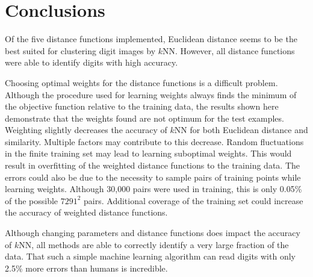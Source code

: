 \documentclass[10pt,twocolumn,letterpaper]{article}
\begin{document}

\section{Conclusions}
Of the five distance functions implemented, Euclidean distance seems to be the best suited for clustering digit images by $k$NN. However, all distance functions were able to identify digits with high accuracy.

Choosing optimal weights for the distance functions is a difficult problem. Although the procedure used for learning weights always finds the minimum of the objective function relative to the training data, the results shown here demonstrate that the weights found are not optimum for the test examples. Weighting slightly decreases the accuracy of $k$NN for both Euclidean distance and similarity. Multiple factors may contribute to this decrease. Random fluctuations in the finite training set may lead to learning suboptimal weights. This would result in overfitting of the weighted distance functions to the training data. The errors could also be due to the necessity to sample pairs of training points while learning weights. Although 30,000 pairs were used in training, this is only 0.05\% of the possible $7291^2$ pairs. Additional coverage of the training set could increase the accuracy of weighted distance functions.

Although changing parameters and distance functions does impact the accuracy of $k$NN, all methods are able to correctly identify a very large fraction of the data. That such a simple machine learning algorithm can read digits with only 2.5\% more errors than humans is incredible.


\nocite{shivas, elkan, bishop}

{\small


}
\end{document}
